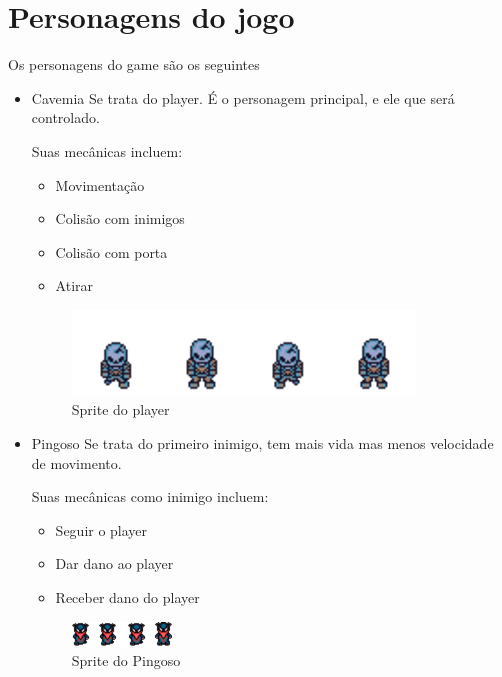 \documentclass[a4paper]{scrreprt}
\begin{document}
    \section{Personagens do jogo}
        Os personagens do game são os seguintes
        \begin{itemize}
            \item Cavemia
                Se trata do player. É o personagem principal, e ele que será controlado.

                Suas mecânicas incluem:
                \begin{itemize}
                    \item Movimentação
                    \item Colisão com inimigos
                    \item Colisão com porta
                    \item Atirar
                \end{itemize}
                \begin{figure}[H]
                    \centering
                    \includegraphics[width=.6\linewidth]{cavemia_frente.png}
                    \caption{Sprite do player}
                    \label{fig:player}
                \end{figure}

            \item Pingoso
                Se trata do primeiro inimigo, tem mais vida mas menos velocidade de movimento.
                
                Suas mecânicas como inimigo incluem:
                \begin{itemize}
                    \item Seguir o player
                    \item Dar dano ao player
                    \item Receber dano do player
                \end{itemize}
                \begin{figure}[H]
                    \centering
                    \includegraphics[width=.47\linewidth]{pingoso_frente.png}
                    \caption{Sprite do Pingoso}
                    \label{fig:pingoso}
                \end{figure}
            

\end{itemize}
\end{document}
